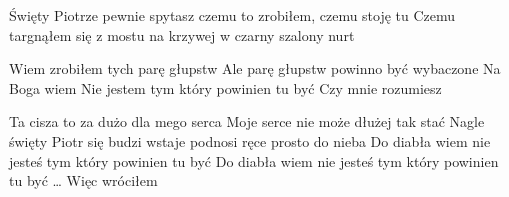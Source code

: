 \documentclass[../../../songbook.tex]{subfiles}
\begin{document}
Święty Piotrze pewnie spytasz czemu to zrobiłem, czemu stoję tu \newline
Czemu targnąłem się z mostu na krzywej w czarny szalony nurt \newline

\-\hspace{1cm} Wiem zrobiłem tych parę głupstw		 \newline
\-\hspace{1cm} Ale parę głupstw powinno być wybaczone	 \newline
\-\hspace{1cm} Na Boga wiem					 \newline
\-\hspace{1cm} Nie jestem tym który powinien tu być	 \newline
\-\hspace{1cm} Czy mnie rozumiesz			\quad  \quad\quad  \quad   {\color{red}\textbf{H	(E E A E E E A E)} } \newline

Ta cisza to za dużo dla mego serca					 \newline
Moje serce nie może dłużej tak stać					 \newline
Nagle święty Piotr się budzi wstaje podnosi ręce prosto do nieba	 \newline
Do diabła wiem nie jesteś tym który powinien tu być		\quad  {} \newline
Do diabła wiem nie jesteś tym który powinien tu być		\quad  {} \newline
… Więc wróciłem \newline
\end{document}
